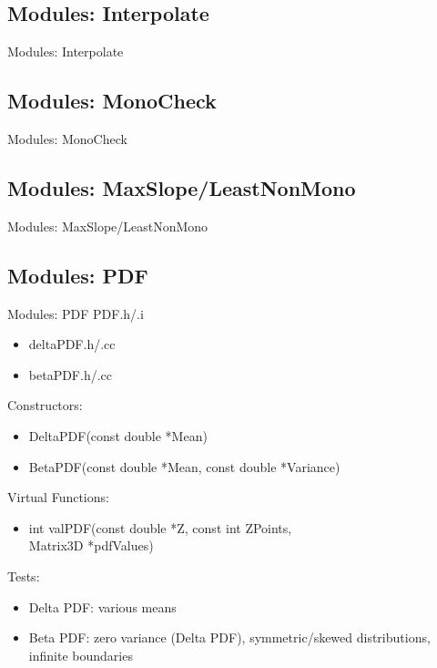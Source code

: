 \documentclass{beamer}
\begin{document}
\subsection{Modules: Interpolate}
\begin{frame}{Modules: Interpolate}
\end{frame}

\subsection{Modules: MonoCheck}
\begin{frame}{Modules: MonoCheck}
\end{frame}

\subsection{Modules: MaxSlope/LeastNonMono}
\begin{frame}{Modules: MaxSlope/LeastNonMono}
\end{frame}

\subsection{Modules: PDF}
\begin{frame}{Modules: PDF}
PDF.h/.i
\begin{itemize}
\item deltaPDF.h/.cc
\item betaPDF.h/.cc
\end{itemize}

Constructors:
\begin{itemize}
\item DeltaPDF(const double *Mean)
\item BetaPDF(const double *Mean, const double *Variance)
\end{itemize}

Virtual Functions:
\begin{itemize}
\item int valPDF(const double *Z, const int ZPoints, \\Matrix3D *pdfValues)
\end{itemize}

Tests:
\begin{itemize}
\item Delta PDF: various means
\item Beta PDF: zero variance (Delta PDF), symmetric/skewed distributions, infinite boundaries
\end{itemize}
\end{frame}
\end{document}
